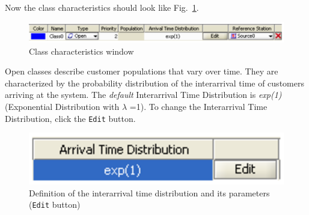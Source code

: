 Now the class characteristics should look like Fig.~\ref{fig:classchar}.

\begin{figure}[htb]
    \begin{center}
        \includegraphics[scale=.5]{img/jsimg/3.3.eps}
    \end{center}
    \caption{Class characteristics window}
    \label{fig:classchar}
\end{figure}

Open classes describe customer populations that vary over time.
They are characterized by the probability distribution of the
interarrival time of customers arriving at the system. The
\emph{default} Interarrival Time Distribution is \emph{exp(1)}
(Exponential Distribution with $\lambda$ =1). To change the
Interarrival Time Distribution, click the \texttt{Edit} button.
\begin{figure}[htb]
    \begin{center}
        \includegraphics[scale=.5]{img/jsimg/3.4.eps}
    \end{center}
    \caption{Definition of the interarrival time distribution and its parameters (\texttt{Edit} button)}
    \label{fig:defclasschar}
\end{figure}

